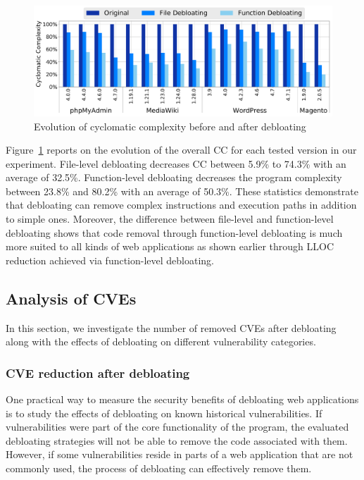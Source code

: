 \begin{figure}[t]
  \includegraphics[width=\linewidth]{figures/lim/cc_over_loc.pdf}
  \caption{Evolution of cyclomatic complexity before and after debloating}
  \label{fig:ccoverloc}
\end{figure}

Figure~\ref{fig:ccoverloc} reports on the evolution of the overall CC for
each tested version in our experiment. File-level debloating decreases
CC between 5.9\% to 74.3\% with an average of 32.5\%.
Function-level debloating decreases the program complexity between 23.8\% and 80.2\% with an average of 50.3\%.
These statistics demonstrate that
debloating can remove complex instructions and execution paths in addition to
simple ones. Moreover, the difference between file-level and function-level
debloating shows that code removal through function-level debloating is much
more suited to all kinds of web applications as shown earlier through LLOC
reduction achieved via function-level debloating.


\subsection{Analysis of CVEs}
In this section, we investigate the number of removed CVEs after debloating
along with the effects of debloating on different vulnerability categories.

\subsubsection{CVE reduction after debloating}
\label{sec:cve_reduction}
One practical way to measure the security benefits of debloating web
applications is to study the effects of debloating on known historical
vulnerabilities. If vulnerabilities were part of the core functionality of the
program, the evaluated debloating strategies will not be able to remove the
code associated with them. However, if some vulnerabilities reside in parts
of a web application that are not commonly used, the process of debloating
can effectively remove them.


